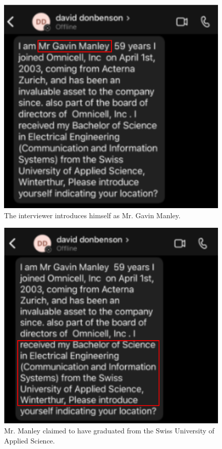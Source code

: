 \begin{fullwidth}
    \begin{figure}[H] %
        \label{sec:Fig10}
        \centering
        \includegraphics[width=.75\linewidth]{assets/ManelyIntroduction.png}
        \captionsetup{justification=centering}
        \caption{The interviewer introduces himself as Mr. Gavin Manley.}
    \end{figure}

    \begin{figure}[H] %
        \label{sec:Fig11}
        \centering
        \includegraphics[width=.9\linewidth]{assets/ManleyInterviewCollege.png}
        \captionsetup{justification=centering}
        \caption{Mr. Manley claimed to have graduated from the Swiss University of Applied Science.}
    \end{figure}


\end{fullwidth}
